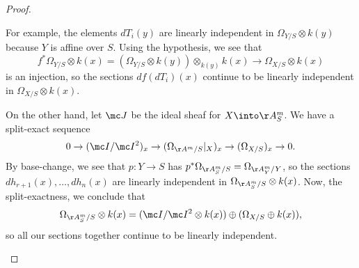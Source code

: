 \documentclass[../notes.tex]{subfiles}
\begin{document}
\begin{proof}
\begin{itemize}
		For example, the elements $dT_i(y)$ are linearly independent in $\Omega_{Y/S}\otimes k(y)$ because $Y$ is affine over $S$. Using the hypothesis, we see that
		\[f^*\Omega_{Y/S}\otimes k(x)=(\Omega_{Y/S}\otimes k(y))\otimes_{k(y)}k(x)\to\Omega_{X/S}\otimes k(x)\]
		is an injection, so the sections $df(dT_i)(x)$ continue to be linearly independent in $\Omega_{X/S}\otimes k(x)$.

		On the other hand, let $\mc J$ be the ideal sheaf for $X\into\AA^m_S$. We have a split-exact sequence
		\[0\to(\mc I/\mc I^2)_x\to(\Omega_{\AA^m/S}|_X)_x\to(\Omega_{X/S})_x\to0.\]
		By base-change, we see that $p\colon Y\to S$ has $p^*\Omega_{\AA^m_S/S}=\Omega_{\AA^m_Y/Y}$, so the sections $dh_{r+1}(x),\ldots,dh_n(x)$ are linearly independent in $\Omega_{\AA^m_S/S}\otimes k(x)$. Now, the split-exactness, we conclude that
		\[\Omega_{\AA^m_S/S}\otimes k(x)=(\mc I/\mc I^2\otimes k(x))\oplus(\Omega_{X/S}\oplus k(x)),\]
		so all our sections together continue to be linearly independent.
		\qedhere
	\end{itemize}
\end{proof}
\end{document}
